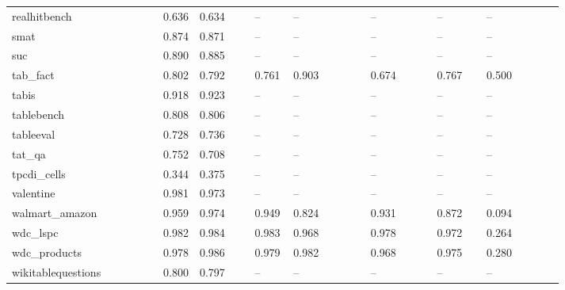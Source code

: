 \begin{table}[htbp]
\begin{tabular}{p{0.121\linewidth}rp{0.108\linewidth}p{0.076\linewidth}p{0.140\linewidth}p{0.121\linewidth}p{0.095\linewidth}p{0.146\linewidth}}
realhitbench & 0.636 & 0.634 & -- & -- & -- & -- & -- \\
smat & 0.874 & 0.871 & -- & -- & -- & -- & -- \\
suc & 0.890 & 0.885 & -- & -- & -- & -- & -- \\
tab\_\allowbreak{}fact & 0.802 & 0.792 & 0.761 & 0.903 & 0.674 & 0.767 & 0.500 \\
tabis & 0.918 & 0.923 & -- & -- & -- & -- & -- \\
tablebench & 0.808 & 0.806 & -- & -- & -- & -- & -- \\
tableeval & 0.728 & 0.736 & -- & -- & -- & -- & -- \\
tat\_\allowbreak{}qa & 0.752 & 0.708 & -- & -- & -- & -- & -- \\
tpcdi\_\allowbreak{}cells & 0.344 & 0.375 & -- & -- & -- & -- & -- \\
valentine & 0.981 & 0.973 & -- & -- & -- & -- & -- \\
walmart\_\allowbreak{}amazon & 0.959 & 0.974 & 0.949 & 0.824 & 0.931 & 0.872 & 0.094 \\
wdc\_\allowbreak{}lspc & 0.982 & 0.984 & 0.983 & 0.968 & 0.978 & 0.972 & 0.264 \\
wdc\_\allowbreak{}products & 0.978 & 0.986 & 0.979 & 0.982 & 0.968 & 0.975 & 0.280 \\
wikitablequestions & 0.800 & 0.797 & -- & -- & -- & -- & -- \\
\bottomrule
\end{tabular}
\end{table}
